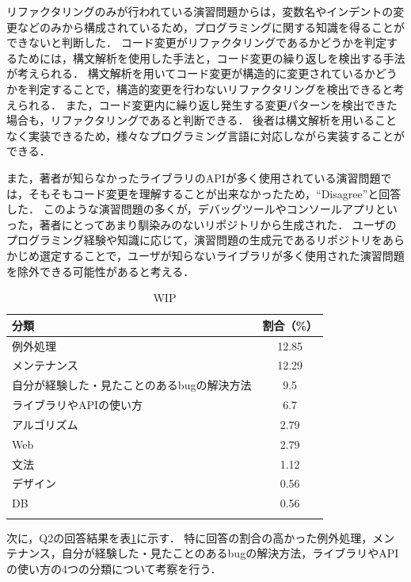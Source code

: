 リファクタリングのみが行われている演習問題からは，変数名やインデントの変更などのみから構成されているため，プログラミングに関する知識を得ることができないと判断した．
コード変更がリファクタリングであるかどうかを判定するためには，構文解析を使用した手法と，コード変更の繰り返しを検出する手法が考えられる．
構文解析を用いてコード変更が構造的に変更されているかどうかを判定することで，構造的変更を行わないリファクタリングを検出できると考えられる．
また，コード変更内に繰り返し発生する変更パターンを検出できた場合も，リファクタリングであると判断できる．
後者は構文解析を用いることなく実装できるため，様々なプログラミング言語に対応しながら実装することができる．

また，著者が知らなかったライブラリのAPIが多く使用されている演習問題では，そもそもコード変更を理解することが出来なかったため，``Disagree''と回答した．
このような演習問題の多くが，デバッグツールやコンソールアプリといった，著者にとってあまり馴染みのないリポジトリから生成された．
ユーザのプログラミング経験や知識に応じて，演習問題の生成元であるリポジトリをあらかじめ選定することで，ユーザが知らないライブラリが多く使用された演習問題を除外できる可能性があると考える．



\begin{table}[t]
  \centering
  \caption{WIP}
  \label{table:lab-study-q2-result}
  \begin{tabular}{ l | c } \Xhline{3\arrayrulewidth}
      分類 & 割合（\%） \\ \hline \hline
      例外処理 & 12.85 \\
      メンテナンス & 12.29  \\
      自分が経験した・見たことのあるbugの解決方法 & 9.5 \\
      ライブラリやAPIの使い方 & 6.7 \\
      アルゴリズム & 2.79 \\
      Web & 2.79 \\
      文法 & 1.12 \\  
      デザイン & 0.56 \\
      DB & 0.56 \\
      \Xhline{3\arrayrulewidth}
  \end{tabular}
\end{table}

次に，Q2の回答結果を表\ref{table:lab-study-q2-result}に示す．
特に回答の割合の高かった例外処理，メンテナンス，自分が経験した・見たことのあるbugの解決方法，ライブラリやAPIの使い方の4つの分類について考察を行う．


